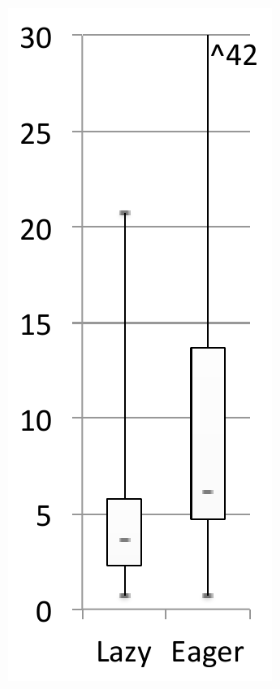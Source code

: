 \documentclass[sigplan,10pt,screen]{acmart}\settopmatter{printfolios=true,printccs=true,printacmref=true}
\begin{document}
\begin{figure}[bth]
	\centering
	\begin{subfigure}[b]{.48\textwidth}
    	\begin{subfigure}[b]{.24\textwidth}
		\includegraphics[width=\linewidth]{figures/netBeansLoad} 

\end{subfigure}
\end{subfigure}
\end{figure}
\end{document}
